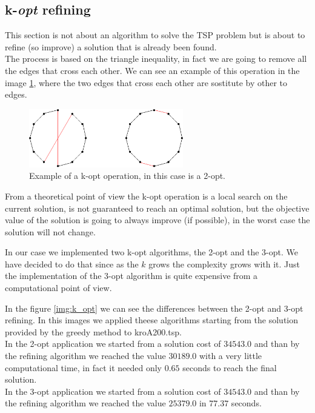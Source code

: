\subsection{k-\textit{opt} refining}
This section is not about an algorithm to solve the TSP problem but is about to refine (so improve) a solution that is already been found.\\
The process is based on the triangle inequality, in fact we are going to remove all the edges that cross each other. We can see an example of this operation in the image \ref{img:k_opt_example}, where the two edges that cross each other are sostitute by other to edges.

\begin{figure}
	\centering
	\includegraphics[width=0.6\textwidth]{images/k_opt}
	\caption{Example of a k-opt operation, in this case is a 2-opt.}
	\label{img:k_opt_example}
\end{figure}

From a theoretical point of view the k-opt operation is a local search on the current solution, is not guaranteed to reach an optimal solution, but the objective value of the solution is going to always improve (if possible), in the worst case the solution will not change.

In our case we implemented two k-opt algorithms, the 2-opt and the 3-opt. We have decided to do that since as the $k$ grows the complexity grows with it. Just the implementation of the 3-opt algorithm is quite expensive from a computational point of view.

In the figure \ref{img:k_opt} we can see the differences between the 2-opt and 3-opt refining. In this images we applied theese algorithms starting from the solution provided by the greedy method to kroA200.tsp. \\
In the 2-opt application we started from a solution cost of $34543.0$ and than by the refining algorithm we reached the value $30189.0$ with a very little computational time, in fact it needed only $0.65$ seconds to reach the final solution.\\
In the 3-opt application we started from a solution cost of $34543.0$ and than by the refining algorithm we reached the value $25379.0$ in $77.37$ seconds.\\


